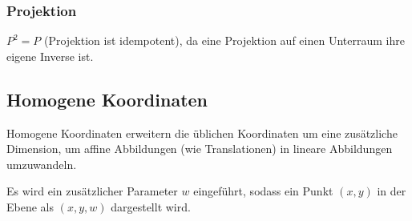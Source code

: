 \documentclass{article}
\begin{document}
\begin{minipage}[t]{0.45\textwidth}
    \subsubsection*{Projektion}
    $P^2 = P$ (Projektion ist idempotent), da eine Projektion auf einen Unterraum ihre eigene Inverse ist.

    \subsection*{Homogene Koordinaten}
    Homogene Koordinaten erweitern die üblichen Koordinaten um eine zusätzliche Dimension, um affine Abbildungen (wie Translationen) in lineare Abbildungen umzuwandeln.
    
    Es wird ein zusätzlicher Parameter \( w \) eingeführt, sodass ein Punkt \( (x, y) \) in der Ebene als \( (x, y, w) \) dargestellt wird.
\end{minipage}
\end{document}

